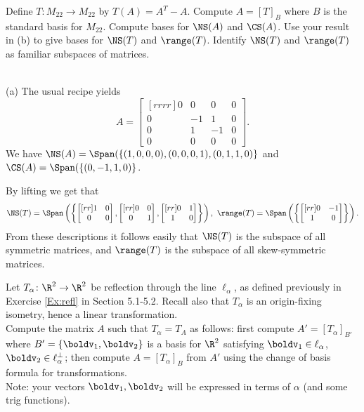 \ii Define $T\colon M_{22}\rightarrow M_{22}$ by $T(A)=A^T-A$. 
\bb
\ii Compute $A=[T]_B$ where $B$ is the standard basis for $M_{22}$. 
\ii Compute bases for $\NS(A)$ and $\CS(A)$.
\ii Use your result in (b) to give bases for $\NS(T)$ and $\range(T)$. 
\ii Identify $\NS(T)$ and $\range(T)$ as familiar subspaces of matrices. 
\ee
\begin{solution}
\ \\
(a) The usual recipe yields 
\[
A=\begin{bmatrix}[rrrr]0&0&0&0\\
0&-1&1&0\\
0&1&-1&0\\
0&0&0&0
\end{bmatrix}.
\]
We have $\NS(A)=\Span(\{(1,0,0,0), (0,0,0,1), (0,1,1,0)\}$ and $\CS(A)=\Span(\{(0,-1,1,0)\}$. 

By lifting we get that 
\[
\NS(T)=\Span\left(\left\{\begin{bmatrix}[rr] 1&0\\ 0&0\end{bmatrix}, \begin{bmatrix}[rr] 0&0\\ 0&1\end{bmatrix}, \begin{bmatrix}[rr]0&1\\ 1&0 \end{bmatrix}\right\}\right), \ \range(T)=\Span\left(\left\{\begin{bmatrix}[rr] 0&-1\\ 1&0\end{bmatrix}\right\}\right).
\]
From these descriptions it follows easily that $\NS(T)$ is the subspace of all symmetric matrices, and $\range(T)$ is the subspace of all skew-symmetric matrices. 
\end{solution}
\ii Let $T_{\alpha}\colon\R^2\rightarrow\R^2$ be reflection through the line $\ell_{\alpha}$, as defined previously in Exercise \ref{Ex:refl} in Section 5.1-5.2. Recall also that $T_{\alpha}$ is an origin-fixing isometry, hence a linear transformation. 
\\
Compute the matrix $A$ such that $T_{\alpha}=T_A$ as follows: first compute $A'=[T_{\alpha}]_{B'}$ where $B'=\{\boldv_1,\boldv_2\}$ is a basis for $\R^2$ satisfying $\boldv_1\in \ell_\alpha$, $\boldv_2\in \ell_\alpha^\perp$; then compute $A=[T_{\alpha}]_B$ from $A'$ using the change of basis formula for transformations. 
\\
Note: your vectors $\boldv_1, \boldv_2$ will be expressed in terms of $\alpha$ (and some trig functions). 
